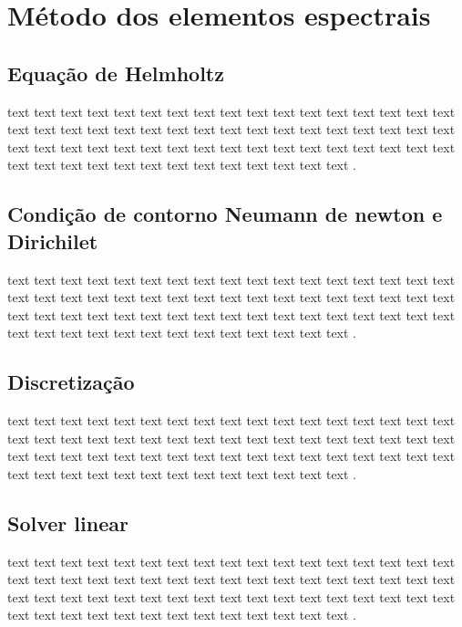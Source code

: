 \chapter{Método dos elementos espectrais}
\label{cap:II}

\section{Equação de Helmholtz}
 text text text text text text text text text text text text text text text text text text text text text text text text text text text text text text text text text text text text text text text text text text text text text text text text text text text text text text text text text text text text text text text text .





\section{Condição de contorno Neumann de newton e Dirichilet}
 text text text text text text text text text text text text text text text text text text text text text text text text text text text text text text text text text text text text text text text text text text text text text text text text text text text text text text text text text text text text text text text text .

\section{Discretização}
 text text text text text text text text text text text text text text text text text text text text text text text text text text text text text text text text text text text text text text text text text text text text text text text text text text text text text text text text text text text text text text text text .
 
\section{Solver linear}
 text text text text text text text text text text text text text text text text text text text text text text text text text text text text text text text text text text text text text text text text text text text text text text text text text text text text text text text text text text text text text text text text .
 
	

